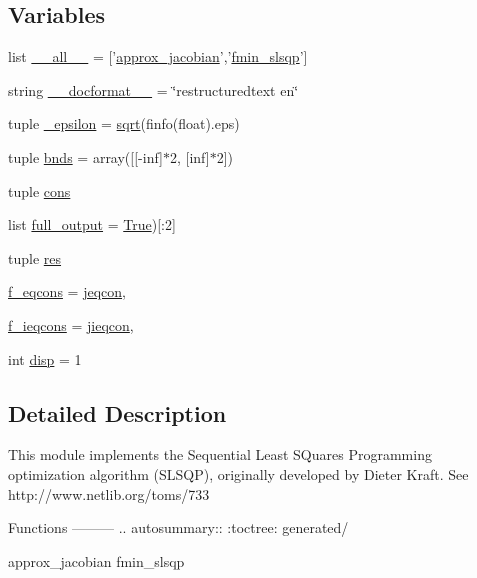 \subsection*{Variables}
\begin{DoxyCompactItemize}
\item 
list \hyperlink{namespacescipy_1_1optimize_1_1slsqp_a0adbc74b5e054eeb60085c572ccf14e2}{\+\_\+\+\_\+all\+\_\+\+\_\+} = \mbox{[}'\hyperlink{namespacescipy_1_1optimize_1_1slsqp_a8bd7e9e2d35f751df61a44c3e0eb445a}{approx\+\_\+jacobian}','\hyperlink{namespacescipy_1_1optimize_1_1slsqp_ac3dab30d04519a7fb85a62039512e338}{fmin\+\_\+slsqp}'\mbox{]}
\item 
string \hyperlink{namespacescipy_1_1optimize_1_1slsqp_a36bc8377bd7cff39d60937a78a89dbe9}{\+\_\+\+\_\+docformat\+\_\+\+\_\+} = \char`\"{}restructuredtext en\char`\"{}
\item 
tuple \hyperlink{namespacescipy_1_1optimize_1_1slsqp_aa973931a73e3dcb40c31ed76fd0a429b}{\+\_\+epsilon} = \hyperlink{vecuops_8cc_ac9f82fdb8cd289615247f897852ee5f2}{sqrt}(finfo(float).eps)
\item 
tuple \hyperlink{namespacescipy_1_1optimize_1_1slsqp_afa02366b6ad7291329bb02bd3cdc0528}{bnds} = array(\mbox{[}\mbox{[}-\/inf\mbox{]}$\ast$2, \mbox{[}inf\mbox{]}$\ast$2\mbox{]})
\item 
tuple \hyperlink{namespacescipy_1_1optimize_1_1slsqp_afd188328f5f66ce62601132cd699c5a0}{cons}
\item 
list \hyperlink{namespacescipy_1_1optimize_1_1slsqp_a456ebd8eb673f37e76bf847157afc98c}{full\+\_\+output} = \hyperlink{libqhull_8h_add3ca9eefe3b5b754426f51d3043e579}{True})\mbox{[}\+:2\mbox{]}
\item 
tuple \hyperlink{namespacescipy_1_1optimize_1_1slsqp_ae506e7b125d0eeec39748e2de3d29a26}{res}
\item 
\hyperlink{namespacescipy_1_1optimize_1_1slsqp_a23ed43f3b7dfd7741e76077a310c9422}{f\+\_\+eqcons} = \hyperlink{namespacescipy_1_1optimize_1_1slsqp_a67cf78303222478a831e2b11c591a193}{jeqcon},
\item 
\hyperlink{namespacescipy_1_1optimize_1_1slsqp_a8bc529ad14da55295d2cf2d17addd929}{f\+\_\+ieqcons} = \hyperlink{namespacescipy_1_1optimize_1_1slsqp_acebb941787a4b0b059a03be7bd77b7a5}{jieqcon},
\item 
int \hyperlink{namespacescipy_1_1optimize_1_1slsqp_a03befd427a784ed4840724d1b667f45a}{disp} = 1
\end{DoxyCompactItemize}


\subsection{Detailed Description}
\begin{DoxyVerb}This module implements the Sequential Least SQuares Programming optimization
algorithm (SLSQP), originally developed by Dieter Kraft.
See http://www.netlib.org/toms/733

Functions
---------
.. autosummary::
   :toctree: generated/

approx_jacobian
fmin_slsqp\end{DoxyVerb}
 

